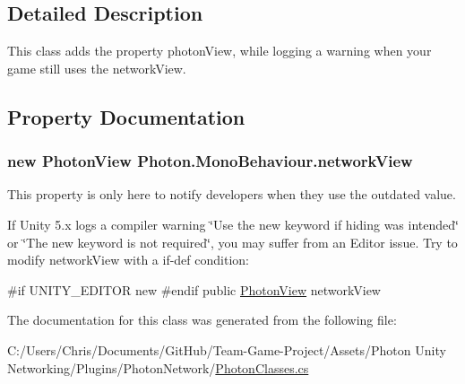 \subsection{Detailed Description}
This class adds the property photon\+View, while logging a warning when your game still uses the network\+View. 



\subsection{Property Documentation}
\subsubsection[{\texorpdfstring{network\+View}{networkView}}]{\setlength{\rightskip}{0pt plus 5cm}new {\bf Photon\+View} Photon.\+Mono\+Behaviour.\+network\+View\hspace{0.3cm}{\ttfamily [get]}}\hypertarget{class_photon_1_1_mono_behaviour_a00c97185c3a8594bf5c1c518a701706e}{}\label{class_photon_1_1_mono_behaviour_a00c97185c3a8594bf5c1c518a701706e}


This property is only here to notify developers when they use the outdated value. 

If Unity 5.\+x logs a compiler warning \char`\"{}\+Use the new keyword if hiding was intended\char`\"{} or \char`\"{}\+The new keyword is not required\char`\"{}, you may suffer from an Editor issue. Try to modify network\+View with a if-\/def condition\+:

\#if U\+N\+I\+T\+Y\+\_\+\+E\+D\+I\+T\+OR new \#endif public \hyperlink{class_photon_view}{Photon\+View} network\+View 

The documentation for this class was generated from the following file\+:\begin{DoxyCompactItemize}
\item 
C\+:/\+Users/\+Chris/\+Documents/\+Git\+Hub/\+Team-\/\+Game-\/\+Project/\+Assets/\+Photon Unity Networking/\+Plugins/\+Photon\+Network/\hyperlink{_photon_classes_8cs}{Photon\+Classes.\+cs}\end{DoxyCompactItemize}
